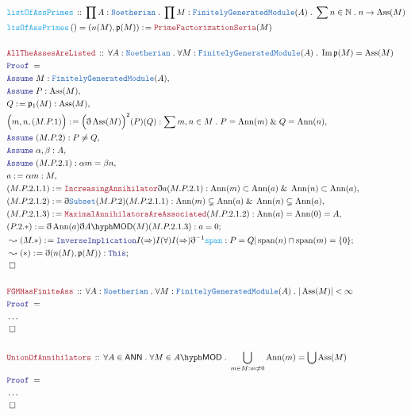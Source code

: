 \documentclass[12pt]{scrartcl}
\newcommand{\TYPE}[1]{\textcolor{NavyBlue}{\mathtt{#1}}}
\newcommand{\FUNC}[1]{\textcolor{Cerulean}{\mathtt{#1}}}
\newcommand{\LOGIC}[1]{\textcolor{Blue}{\mathtt{#1}}}
\newcommand{\THM}[1]{\textcolor{Maroon}{\mathtt{#1}}}
\renewcommand{\.}{\; . \;}
\newcommand{\de}{: \kern 0.1pc =}
\newcommand{\Act}[1]{\left(#1\right)}
\newcommand{\Theorem}[2]{& \THM{#1} \, :: \, #2 \\ & \Proof = \\ }
\newcommand{\DeclareFunc}[2]{& \FUNC{#1} \, :: \, #2 \\}
\newcommand{\DefineNamedFunc}[4]{&  \FUNC{#1}\Act{#2} = #3 \de #4 \\}
\newcommand{\Page}[1]{ \begin{align*} #1 \end{align*}   }
\newcommand{ \bd }{ \ByDef }
\newcommand{\NoProof}{ & \ldots \\ \EndProof}
\renewcommand{\And}{\; \& \;}
\newcommand{\Nat}{\mathbb{N} }
\DeclareMathOperator*{\im}{Im}
\newcommand{\Say}[3]{& #1 \de #2 : #3, \\}
\newcommand{\Conclude}[3]{& #1 \de #2 : #3; \\}
\newcommand{\DeriveConclude}[3]{& \leadsto #1 \de #2 : #3 ; \\}
\newcommand{\Assume}[2]{& \LOGIC{Assume} \; #1 : #2, \\}
\newcommand{\QED}{\; \square}
\newcommand{\EndProof}{& \QED \\}
\newcommand{\ByDef}{\eth}
\newcommand{\Proof}{\LOGIC{Proof} \; }
\newcommand{\FGM}{\TYPE{FinitelyGeneratedModule}}
\DeclareMathOperator{\Span}{span}
\DeclareMathOperator{\Ann}{Ann}
\DeclareMathOperator{\Ass}{Ass}
\newcommand{\LMOD}[1]{#1\hyph\mathsf{MOD}}
\newcommand{\ANN}{\mathsf{ANN}}
\begin{document}
\Page{
	\DeclareFunc{listOfAssPrimes}{\prod A : \TYPE{Noetherian} \. \prod M : \FGM(A) \. \sum n \in \Nat \. n \to \Ass(M) }
	\DefineNamedFunc{lisOfAssPrimes}{}{(n(M),\mathfrak{p}(M))}{\THM{PrimeFactorizationSeria}(M)}
	\\
	\Theorem{AllTheAssesAreListed }{ \forall A : \TYPE{Noetherian} \. \forall M : \FGM(A) \. \im \mathfrak{p}(M) = \Ass(M)}
	\Assume{M}{\FGM(A)}
	\Assume{P}{\Ass(M)}
	\Say{Q}{\mathfrak{p}_1(M)}{\Ass(M)}
	\Say{\Big(m,n,(M.P.1)\Big)}{\Big(\bd \Ass(M)\Big)^2(P)(Q)}{ \sum m,n \in M \. P = \Ann(m) \And Q = \Ann(n)}
	\Assume{(M.P.2)}{P \neq Q}
	\Assume{\alpha,\beta}{A}
	\Assume{(M.P.2.1)}{\alpha m = \beta n}
	\Say{a}{\alpha m}{M}
	\Say{(M.P.2.1.1)}{\THM{IncreasingAnnihilator}\bd a (M.P.2.1)}{ \Ann(m) \subset \Ann(a) \And \Ann(n) \subset \Ann(a) }
	\Say{(M.P.2.1.2)}{\bd \TYPE{Subset}(M.P.2)(M.P.2.1.1)}{\Ann(m) \subsetneq \Ann(a) \And \Ann(n) \subsetneq \Ann(a)}
	\Say{(M.P.2.1.3)}{\THM{MaximalAnnihilatorsAreAssociated}(M.P.2.1.2)}{\Ann(a) = \Ann(0) =  A}
	\Conclude{(P.2.*)}{ \bd \Ann(a)\bd\LMOD{A}(M)(M.P.2.1.3)}{a = 0}
	\DeriveConclude{(M.*)}{\LOGIC{InverseImplication}I(\Rightarrow)I(\forall)I(\Rightarrow)\bd^{-1}\FUNC{span}}
	{  P = Q | \Span(n) \cap \Span(m) = \{0\} }
	\DeriveConclude{(*)}{\bd (n(M),\mathfrak{p}(M))}{\LOGIC{This}}
	\EndProof
	\\
	\Theorem{FGMHasFiniteAss}{\forall A : \TYPE{Noetherian} \. \forall M : \FGM(A) \. |\Ass(M)|<\infty  }
	\NoProof
	\\
	\Theorem{UnionOfAnnihilators}{ \forall A \in \ANN \. \forall M \in \LMOD{A} \. 
	\bigcup_{m \in M : m \neq 0} \Ann(m) = \bigcup \Ass(M)  }
	\NoProof
}
\newpage
\end{document}
